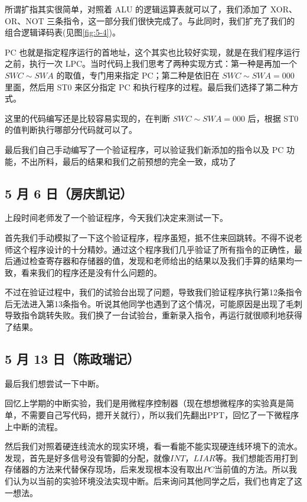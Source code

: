 \documentclass[12pt]{article}
\begin{document}
{        所谓扩指其实很简单，对照着 ALU 的逻辑运算表就可以了，我们添加了 XOR、OR、NOT 三条指令，这一部分我们很快完成了。与此同时，我们扩充了我们的组合逻辑译码表(见图\ref{fig:5-4})。
        
        PC 也就是指定程序运行的首地址，这个其实也比较好实现，就是在我们程序运行之前，执行一次 LPC。当时代码上我们思考了两种实现方式：第一种是再加一个 $SWC\sim SWA$ 的取值，专门用来指定 PC；第二种是依旧在 $SWC\sim SWA=000$ 里面，然后用 ST0 来区分指定 PC 和执行程序的过程。最后我们选择了第二种方式。
        
        这里的代码编写还是比较容易实现的，在判断 $SWC\sim SWA=000$ 后，根据 ST0 的值判断执行哪部分代码就可以了。
        
        最后我们自己手动编写了一个验证程序，可以验证我们新添加的指令以及 PC 功能，不出所料，最后的结果和我们之前预想的完全一致，成功了~
        
    \subsection{5 月 6 日（房庆凯记）}
        上段时间老师发了一个验证程序，今天我们决定来测试一下。
        
        首先我们手动模拟了一下这个验证程序，程序虽短，抵不住来回跳转。不得不说老师这个程序设计的十分精妙。通过这个程序我们几乎验证了所有指令的正确性，最后通过检查寄存器和存储器的值，发现和老师给出的结果以及我们手算的结果均一致，看来我们的程序还是没有什么问题的。
        
        不过在验证过程中，我们的试验台出现了问题，导致我们验证程序执行第12条指令后无法进入第13条指令。听说其他同学也遇到了这个情况，可能原因是出现了毛刺导致指令跳转失败。我们换了一台试验台，重新录入指令，再运行就很顺利地获得了结果。
        
    \subsection{5 月 13 日（陈政瑞记）}
        最后我们想尝试一下中断。
        
        回忆上学期的中断实验，我们是用微程序控制器（现在想想微程序的实验真是简单，不需要自己写代码，摁开关就行），所以我们先翻出PPT，回忆了一下微程序上中断的流程。
        
        然后我们对照着硬连线流水的现实环境，看一看能不能实现硬连线环境下的流水。发现，首先是好多信号没有管脚的分配，就像$INT$，$LIAR$等。我们想能否用打到存储器的方法来代替保存现场，后来发现根本没有取出$PC$当前值的方法。所以我们认为以当前的实验环境没法实现中断。后来询问其他同学之后，我们也肯定了这一想法。
        
}
\end{document}
